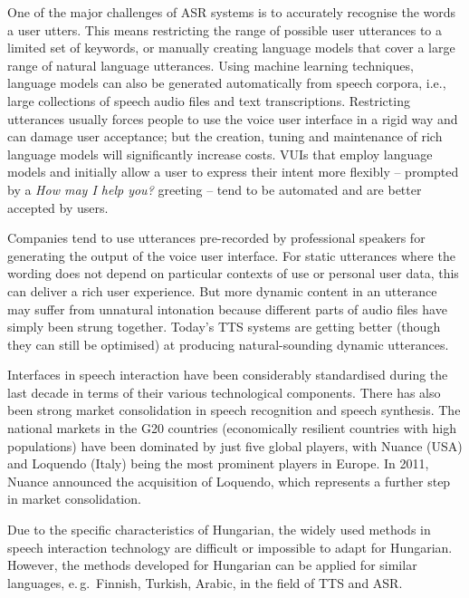 \begin{multicols}{2}
One of the major challenges of ASR systems is to accurately recognise the words a user utters. This means restricting the range of possible user utterances to a limited set of keywords, or manually creating language models that cover a large range of natural language utterances. Using machine learning techniques, language models can also be generated automatically from speech corpora, i.e., large collections of speech audio files and text transcriptions. Restricting utterances usually forces people to use the voice user interface in a rigid way and can damage user acceptance; but the creation, tuning and maintenance of rich language models will significantly increase costs. VUIs that employ language models and initially allow a user to express their intent more flexibly -- prompted by a \textit{How may I help you?} greeting -- tend to be automated and are better accepted by users.


Companies tend to use utterances pre-recorded by professional speakers for generating the output of the voice user interface. For static utterances where the wording does not depend on particular contexts of use or personal user data, this can deliver a rich user experience. But more dynamic content in an utterance may suffer from unnatural intonation because different parts of audio files have simply been strung together. Today's TTS systems are getting better (though they can still be optimised) at producing natural-sounding dynamic utterances. 

Interfaces in speech interaction have been considerably standardised during the last decade in terms of their various technological components. There has also been strong market consolidation in speech recognition and speech synthesis. The national markets in the G20 countries (economically resilient countries with high populations) have been dominated by just five global players, with Nuance (USA) and Loquendo (Italy) being the most prominent players in Europe. In 2011, Nuance announced the acquisition of Loquendo, which represents a further step in market consolidation.

Due to the specific characteristics of Hungarian, the widely used methods in speech interaction technology are difficult or impossible to adapt for Hungarian. However, the methods developed for Hungarian can be applied for similar languages, e.\,g.~Finnish, Turkish, Arabic, in the field of TTS and ASR. 


\end{multicols}
